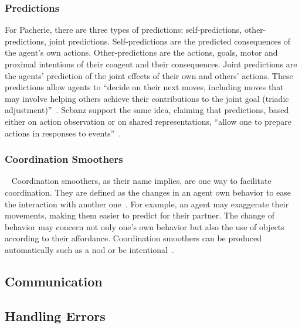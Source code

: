 \documentclass[a4paper,11pt,twoside]{StyleThese}
\begin{document}
\subsubsection{Predictions}\label{chap1:subsubsec:pred}
For Pacherie, there are three types of predictions: self-predictions, other-predictions, joint predictions. Self-predictions are the predicted consequences of the agent's own actions. Other-predictions are the actions, goals, motor and proximal intentions of their coagent and their consequences. Joint predictions are the agents' prediction of the joint effects of their own and others' actions. These predictions allow agents to ``decide on their next moves, including moves that may involve helping others achieve their contributions to the joint goal (triadic adjustment)''~\cite[pp.~354-355]{pacherie_2012_agency}. Sebanz \etal{} support the same idea, claiming that predictions, based either on action observation or on shared representations, ``allow one to prepare actions in responses to events''~\cite[p.~73]{sebanz_2006_joint}.

\subsubsection{Coordination Smoothers}~\label{chap1:subsubsec:coord_smooth}
Coordination smoothers, as their name implies, are one way to facilitate coordination. They are defined as the changes in an agent own behavior to ease the interaction with another one~\cite{vesper_2010_minimal}. For example, an agent may exaggerate their movements, making them easier to predict for their partner. The change of behavior may concern not only one's own behavior but also the use of objects according to their affordance. Coordination smoothers can be produced automatically such as a nod or be intentional~\cite{michael_2015_commitments}.


\subsection{Communication}

\subsection{Handling Errors}
\end{document}

